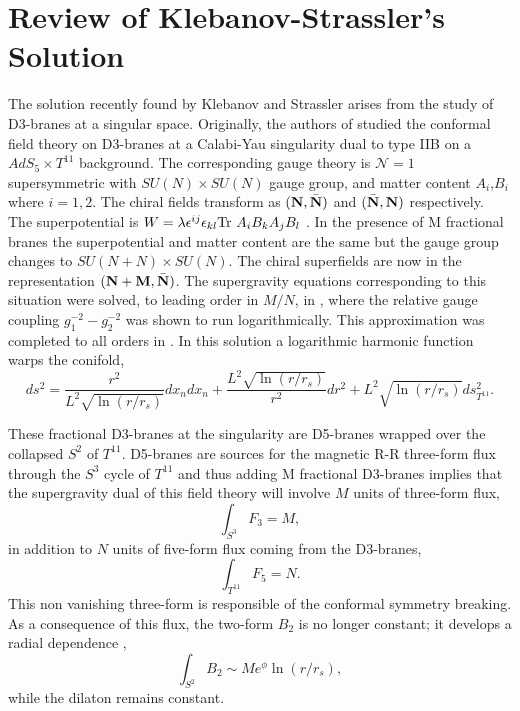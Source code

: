 \documentclass[12pt,epsf,a4paper]{article}
\begin{document}


\section {Review of Klebanov-Strassler's Solution}{\label{review}} 

The solution recently found by Klebanov and Strassler arises from the 
study of D3-branes at a singular space. Originally, 
the authors of \cite{KW1} studied the conformal field theory on D3-branes at a Calabi-Yau 
singularity dual to type IIB on a $AdS_5 \times T^{11}$ background. The corresponding 
gauge theory is 
${\mathcal N} =1$ supersymmetric with  $SU(N) \times SU(N)$ 
gauge group, and matter content $A_{i}$,$B_{i}$ where $i=1,2$. The chiral fields 
transform as $({\bf N}, 
{\bar {\bf N}})$ and  $({\bar {\bf N}},{\bf N})$ respectively. 
The superpotential is $W = \lambda \epsilon^{ij} \epsilon_{kl} \hbox {Tr } A_i B_k A_j B_l$ . 
In the presence of M fractional branes the superpotential and matter
content are the same but the gauge group changes to $SU(N+N)\times SU(N)$. The chiral
superfields are  now in the representation $({\bf N+M}, {\bar {\bf N}})$. The supergravity 
equations corresponding to this situation were solved, to leading 
order in $M/N$, in \cite{KN}, where the relative gauge coupling $g_1^{-2}-g_2^{-2}$ was 
shown to run logarithmically. This approximation was completed to all orders in \cite{KT}. 
In this solution  a logarithmic harmonic function warps the conifold,
\begin{equation}
ds^2 = \frac {r^2}{L^2 \sqrt{\ln (r/r_s)}} dx_n dx_n + \frac {L^2 \sqrt{ \ln (r/r_s)}}{r^2} 
dr^2 + L^2 \sqrt{ \ln (r/r_s)} ds^2_{T^{11}}.
\label{1}
\end{equation}
  
These fractional D3-branes at the singularity are D5-branes wrapped over the 
collapsed $S^2$ of $T^{11}$. D5-branes are sources for 
the magnetic R-R three-form flux through the $S^3$ cycle of $T^{11}$ and thus 
adding M fractional D3-branes implies that  the supergravity dual 
of this field theory will involve $M$ units of three-form flux,
\begin{equation}
\int_{S^3} F_3 = M,
\label{2}
\end{equation}
in addition to  $N$ units of five-form flux coming from the D3-branes,
\begin{equation}
\int_{T^{11}} F_5 = N.
\label{3}
\end{equation}
This non vanishing three-form is  responsible of the conformal symmetry 
breaking. As a consequence of this flux, the two-form $B_2$ is no longer constant; it 
develops a radial dependence \cite{KN},
\begin{equation}
\int_{S^2} B_2 \sim M e^{\phi} \ln (r/r_s),
\label{4}
\end{equation}
while the dilaton remains constant.
  
\end{document}
